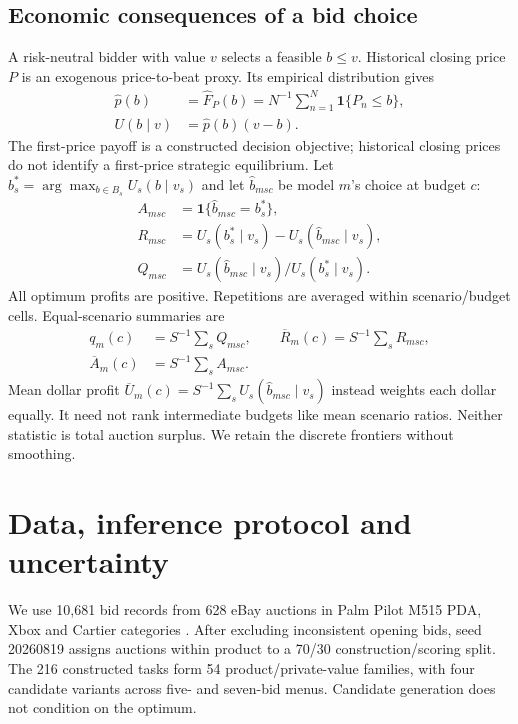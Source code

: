 \documentclass[sigconf,anonymous,nonacm]{acmart}
\begin{document}
\subsection{Economic consequences of a bid choice}
A risk-neutral bidder with value $v$ selects a feasible $b\leq v$. Historical closing price $P$ is an exogenous price-to-beat proxy. Its empirical distribution gives
\begin{equation}\begin{aligned}
\widehat p(b)&=\widehat F_P(b)=N^{-1}\sum_{n=1}^N\mathbf1\{P_n\leq b\},\\
U(b\mid v)&=\widehat p(b)(v-b).
\end{aligned}\label{eq:auctionutility}\end{equation}
The first-price payoff is a constructed decision objective; historical closing prices do not identify a first-price strategic equilibrium. Let $b_s^*=\arg\max_{b\in B_s}U_s(b\mid v_s)$ and let $\widehat b_{msc}$ be model $m$'s choice at budget $c$:
\begin{equation}\begin{aligned}
A_{msc}&=\mathbf1\{\widehat b_{msc}=b_s^*\},\\
R_{msc}&=U_s(b_s^*\mid v_s)-U_s(\widehat b_{msc}\mid v_s),\\
Q_{msc}&=U_s(\widehat b_{msc}\mid v_s)/U_s(b_s^*\mid v_s).
\end{aligned}\label{eq:metrics}\end{equation}
All optimum profits are positive. Repetitions are averaged within scenario/budget cells. Equal-scenario summaries are
\begin{equation}\begin{aligned}
q_m(c)&=S^{-1}\sum_s Q_{msc},\qquad
\overline R_m(c)=S^{-1}\sum_s R_{msc},\\
\overline A_m(c)&=S^{-1}\sum_s A_{msc}.
\end{aligned}\label{eq:frontier}\end{equation}
Mean dollar profit $\overline U_m(c)=S^{-1}\sum_s U_s(\widehat b_{msc}\mid v_s)$ instead weights each dollar equally. It need not rank intermediate budgets like mean scenario ratios. Neither statistic is total auction surplus. We retain the discrete frontiers without smoothing.

\section{Data, inference protocol and uncertainty}
\label{sec:protocol}
We use 10,681 bid records from 628 eBay auctions in Palm Pilot M515 PDA, Xbox and Cartier categories \citep{jank2010modeling,onlineauctionsdataset}. After excluding inconsistent opening bids, seed 20260819 assigns auctions within product to a 70/30 construction/scoring split. The 216 constructed tasks form 54 product/private-value families, with four candidate variants across five- and seven-bid menus. Candidate generation does not condition on the optimum.
\end{document}

